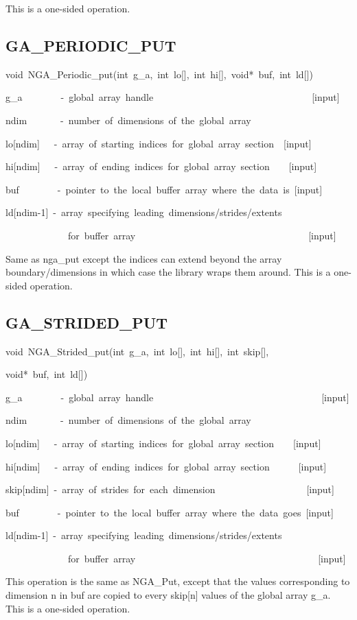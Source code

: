 This is a one-sided operation. 


\subsection*{\label{sub:GA_PERIODIC_PUT}GA\_PERIODIC\_PUT}
\begin{lyxcode}
void~NGA\_Periodic\_put(int~g\_a,~int~lo{[}{]},~int~hi{[}{]},~void{*}~buf,~int~ld{[}{]})



g\_a~~~~~~~~-~global~array~handle~~~~~~~~~~~~~~~~~~~~~~~~~~~~~~~~~{[}input{]}~

ndim~~~~~~~-~number~of~dimensions~of~the~global~array

lo{[}ndim{]}~~~-~array~of~starting~indices~for~global~array~section~~{[}input{]}

hi{[}ndim{]}~~~-~array~of~ending~indices~for~global~array~section~~~~{[}input{]}

buf~~~~~~~~-~pointer~to~the~local~buffer~array~where~the~data~is~{[}input{]}~

ld{[}ndim-1{]}~-~array~specifying~leading~dimensions/strides/extents

~~~~~~~~~~~~~for~buffer~array~~~~~~~~~~~~~~~~~~~~~~~~~~~~~~~~~~~~{[}input{]}
\end{lyxcode}
Same as nga\_put except the indices can extend beyond the array boundary/dimensions
in which case the library wraps them around. This is a one-sided operation. 


\subsection*{\label{sub:GA_STRIDED_PUT}GA\_STRIDED\_PUT}
\begin{lyxcode}
void~NGA\_Strided\_put(int~g\_a,~int~lo{[}{]},~int~hi{[}{]},~int~skip{[}{]},

void{*}~buf,~int~ld{[}{]})



g\_a~~~~~~~~-~global~array~handle~~~~~~~~~~~~~~~~~~~~~~~~~~~~~~~~~~~{[}input{]}

ndim~~~~~~~-~number~of~dimensions~of~the~global~array~

lo{[}ndim{]}~~~-~array~of~starting~indices~for~global~array~section~~~~{[}input{]}

hi{[}ndim{]}~~~-~array~of~ending~indices~for~global~array~section~~~~~~{[}input{]}

skip{[}ndim{]}~-~array~of~strides~for~each~dimension~~~~~~~~~~~~~~~~~~~{[}input{]}

buf~~~~~~~~-~pointer~to~the~local~buffer~array~where~the~data~goes~{[}input{]}~

ld{[}ndim-1{]}~-~array~specifying~leading~dimensions/strides/extents~

~~~~~~~~~~~~~for~buffer~array~~~~~~~~~~~~~~~~~~~~~~~~~~~~~~~~~~~~~~{[}input{]}
\end{lyxcode}
This operation is the same as NGA\_Put, except that the values corresponding
to dimension n in buf are copied to every skip{[}n{]} values of the
global array g\_a. This is a one-sided operation. 


